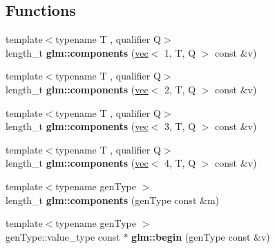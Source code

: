 \subsection*{Functions}
\begin{DoxyCompactItemize}
\item 
\mbox{\label{group__gtx__range_gaf2831875a8cee7cc000abadba2aa1265}} 
{\footnotesize template$<$typename T , qualifier Q$>$ }\\length\+\_\+t {\bfseries glm\+::components} (\hyperlink{structglm_1_1vec}{vec}$<$ 1, T, Q $>$ const \&v)
\item 
\mbox{\label{group__gtx__range_ga30085e4904149502aac186e95d5604bf}} 
{\footnotesize template$<$typename T , qualifier Q$>$ }\\length\+\_\+t {\bfseries glm\+::components} (\hyperlink{structglm_1_1vec}{vec}$<$ 2, T, Q $>$ const \&v)
\item 
\mbox{\label{group__gtx__range_gae7c3451f88f2550ed896da642cdbfd2d}} 
{\footnotesize template$<$typename T , qualifier Q$>$ }\\length\+\_\+t {\bfseries glm\+::components} (\hyperlink{structglm_1_1vec}{vec}$<$ 3, T, Q $>$ const \&v)
\item 
\mbox{\label{group__gtx__range_ga6a306e940263c39ce05d378f68a7caff}} 
{\footnotesize template$<$typename T , qualifier Q$>$ }\\length\+\_\+t {\bfseries glm\+::components} (\hyperlink{structglm_1_1vec}{vec}$<$ 4, T, Q $>$ const \&v)
\item 
\mbox{\label{group__gtx__range_ga946358ba868fc33d234e7ee3ac1b7912}} 
{\footnotesize template$<$typename gen\+Type $>$ }\\length\+\_\+t {\bfseries glm\+::components} (gen\+Type const \&m)
\item 
\mbox{\label{group__gtx__range_gaadcca0cd1ffc54deb39e983bfdcbcdd2}} 
{\footnotesize template$<$typename gen\+Type $>$ }\\gen\+Type\+::value\+\_\+type const  $\ast$ {\bfseries glm\+::begin} (gen\+Type const \&v)
\item 
\mbox{\label{group__gtx__range_ga785aa0c9cf7d925318863f950eb81618}} 

\end{DoxyCompactItemize}
